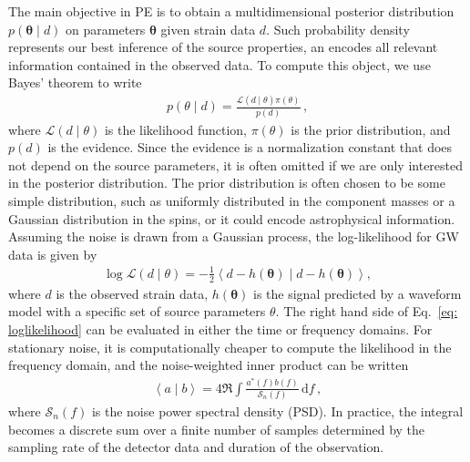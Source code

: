 \documentclass[twocolumn]{aastex631}
\begin{document}
The main objective in PE is to obtain a multidimensional posterior distribution
$p(\mathbf{\theta} \mid d)$ on parameters $\mathbf{\theta}$ given strain
data $d$.  Such probability density represents our best inference of
the source properties, an encodes all relevant information contained in the
observed data.
To compute this object, we use Bayes' theorem to write
\begin{align}
    p(\theta \mid d) = \frac{\mathcal{L}(d \mid \theta)\pi(\theta)}{p(d)}\, ,
\end{align}
where $\mathcal{L}(d \mid \theta)$ is the likelihood function, $\pi(\theta)$ is the
prior distribution, and $p(d)$ is the evidence. Since the evidence is a
normalization constant that does not depend on the source parameters, it is
often omitted if we are only interested in the posterior distribution. The prior
distribution is often chosen to be some simple distribution, such as uniformly
distributed in the component masses or a Gaussian distribution in the spins, or it could encode astrophysical information.
Assuming the noise is drawn from a Gaussian process, the
log-likelihood for GW data is given by
\begin{align}
    \log{\mathcal{L}(d \mid \theta)} = -\frac{1}{2} \left\langle d-h(\mathbf{\theta}) \mid d-h(\mathbf{\theta})\right\rangle,
\label{eq: loglikelihood}
\end{align}
where $d$ is the observed strain data, $h(\mathbf{\theta})$ is the signal predicted by a
waveform model with a specific set of source parameters $\theta$. The right hand side of
Eq.~\eqref{eq: loglikelihood} can be evaluated in either the time or frequency domains.
For stationary noise, it is computationally cheaper to compute the likelihood in the frequency
domain, and the noise-weighted inner product can be written 
\begin{align}
    \left\langle a \mid b\right\rangle = 4 \Re \int \frac{a^*(f)b(f)}{\mathcal{S}_n(f)}\, \mathrm{d}f \, ,
\label{eq: innerproduct}
\end{align}
where $\mathcal{S}_n(f)$ is the noise power spectral density (PSD).
In practice, the integral becomes a discrete sum over a finite number of
samples determined by the sampling rate of the detector data and duration of
the observation.
\end{document}
